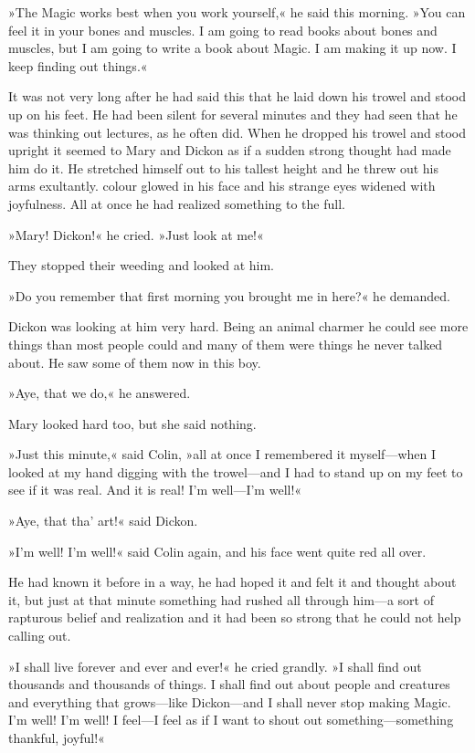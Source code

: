 »The Magic works best when you work yourself,« he said this morning. »You can feel it in your bones and muscles. I am going to read books about bones and muscles, but I am going to write a book about Magic. I am making it up now. I keep finding out things.«

It was not very long after he had said this that he laid down his trowel and stood up on his feet. He had been silent for several minutes and they had seen that he was thinking out lectures, as he often did. When he dropped his trowel and stood upright it seemed to Mary and Dickon as if a sudden strong thought had made him do it. He stretched himself out to his tallest height and he threw out his arms exultantly. colour glowed in his face and his strange eyes widened with joyfulness. All at once he had realized something to the full.

»Mary! Dickon!« he cried. »Just look at me!«

They stopped their weeding and looked at him.

»Do you remember that first morning you brought me in here?« he demanded.

Dickon was looking at him very hard. Being an animal charmer he could see more things than most people could and many of them were things he never talked about. He saw some of them now in this boy.

»Aye, that we do,« he answered.

Mary looked hard too, but she said nothing.

»Just this minute,« said Colin, »all at once I remembered it myself—when I looked at my hand digging with the trowel—and I had to stand up on my feet to see if it was real. And it is real! I'm well—I'm well!«

»Aye, that tha' art!« said Dickon.

»I'm well! I'm well!« said Colin again, and his face went quite red all over.

He had known it before in a way, he had hoped it and felt it and thought about it, but just at that minute something had rushed all through him—a sort of rapturous belief and realization and it had been so strong that he could not help calling out.

»I shall live forever and ever and ever!« he cried grandly. »I shall find out thousands and thousands of things. I shall find out about people and creatures and everything that grows—like Dickon—and I shall never stop making Magic. I'm well! I'm well! I feel—I feel as if I want to shout out something—something thankful, joyful!«


